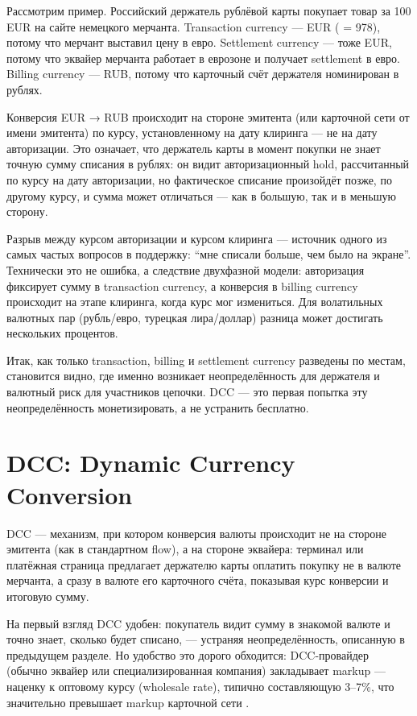 Рассмотрим пример. Российский держатель рублёвой карты
 покупает товар за 100 EUR на сайте немецкого
мерчанта. Transaction currency — EUR ( = 978),
потому что мерчант выставил цену в евро. Settlement
currency — тоже EUR, потому что эквайер мерчанта работает
в еврозоне и получает settlement в евро. Billing currency —
RUB, потому что карточный счёт держателя номинирован в рублях.

Конверсия EUR → RUB происходит на стороне эмитента (или карточной
сети от имени эмитента) по курсу, установленному 
на дату клиринга — не на дату авторизации. Это означает,
что держатель карты в момент покупки не знает точную сумму
списания в рублях: он видит авторизационный hold,
рассчитанный по курсу на дату авторизации, но фактическое
списание произойдёт позже, по другому курсу, и сумма может
отличаться — как в большую, так и в меньшую сторону.

\begin{kaobox}[title=Важно, colback=red!5, colbacktitle=red!20]
  Разрыв между курсом авторизации и курсом клиринга —
  источник одного из самых частых вопросов в поддержку:
  \enquote{мне списали больше, чем было на экране}. Технически
  это не ошибка, а следствие двухфазной модели: авторизация
  фиксирует сумму в transaction currency, а конверсия
  в billing currency происходит на этапе клиринга, когда
  курс мог измениться. Для волатильных валютных пар
  (рубль/евро, турецкая лира/доллар) разница может
  достигать нескольких процентов.
\end{kaobox}

Итак, как только transaction, billing и settlement currency разведены
по местам, становится видно, где именно возникает неопределённость
для держателя и валютный риск для участников цепочки. DCC —
это первая попытка эту неопределённость монетизировать,
а не устранить бесплатно.

\section{DCC: Dynamic Currency Conversion}
\label{sec:mc-dcc}

DCC — механизм, при котором конверсия валюты происходит не на стороне эмитента (как в стандартном flow), а на стороне
эквайера: терминал или платёжная страница предлагает держателю карты оплатить покупку не в валюте мерчанта, а сразу в
валюте его карточного счёта, показывая курс конверсии и итоговую сумму.

На первый взгляд DCC удобен: покупатель видит сумму в знакомой
валюте и точно знает, сколько будет списано, — устраняя
неопределённость, описанную в предыдущем разделе. Но удобство
это дорого обходится: DCC-провайдер (обычно эквайер
или специализированная компания) закладывает markup — наценку
к оптовому курсу (wholesale rate), типично составляющую
3--7\%, что значительно превышает markup карточной
сети .

